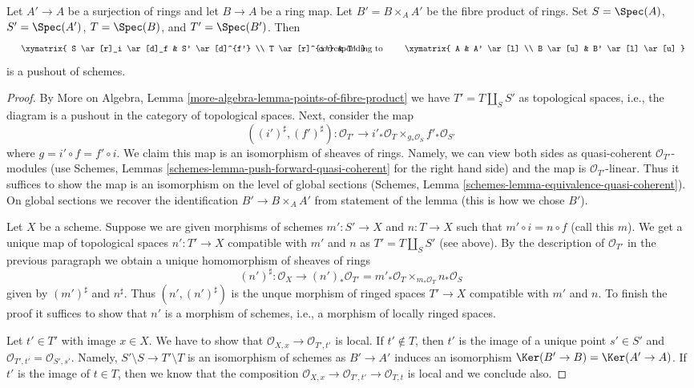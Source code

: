 \begin{lemma}
\label{lemma-basic-example-pushout}
Let $A' \to A$ be a surjection of rings and let $B \to A$ be a ring map.
Let $B' = B \times_A A'$ be the fibre product of rings. Set
$S = \Spec(A)$, $S' = \Spec(A')$, $T = \Spec(B)$, and $T' = \Spec(B')$.
Then
$$
\vcenter{
\xymatrix{
S \ar[r]_i \ar[d]_f & S' \ar[d]^{f'} \\
T \ar[r]^{i'} & T'
}
}
\quad\text{corresponding to}\quad
\vcenter{
\xymatrix{
A & A' \ar[l] \\
B \ar[u] & B' \ar[l] \ar[u]
}
}
$$
is a pushout of schemes.
\end{lemma}

\begin{proof}
By More on Algebra, Lemma \ref{more-algebra-lemma-points-of-fibre-product}
we have $T' = T \amalg_S S'$ as topological spaces, i.e., the diagram
is a pushout in the category of topological spaces. Next, consider
the map
$$
((i')^\sharp, (f')^\sharp) :
\mathcal{O}_{T'}
\longrightarrow
i'_*\mathcal{O}_T \times_{g_*\mathcal{O}_S} f'_*\mathcal{O}_{S'}
$$
where $g = i' \circ f = f' \circ i$. We claim this map is an isomorphism of
sheaves of rings. Namely, we can view both sides as quasi-coherent
$\mathcal{O}_{T'}$-modules (use
Schemes, Lemmas \ref{schemes-lemma-push-forward-quasi-coherent}
for the right hand side) and the map is $\mathcal{O}_{T'}$-linear.
Thus it suffices to show the map is an isomorphism on the level
of global sections
(Schemes, Lemma \ref{schemes-lemma-equivalence-quasi-coherent}).
On global sections we recover the identification
$B' \to B \times_A A'$ from statement of the lemma (this is
how we chose $B'$).

\medskip\noindent
Let $X$ be a scheme. Suppose we are given morphisms of schemes
$m' : S' \to X$ and $n : T \to X$ such that $m' \circ i = n \circ f$
(call this $m$). We get a unique map of topological spaces
$n' : T' \to X$ compatible with $m'$ and $n$ as
$T' = T \amalg_S S'$ (see above).
By the description of $\mathcal{O}_{T'}$ in the previous
paragraph we obtain a unique homomorphism of sheaves of rings
$$
(n')^\sharp :
\mathcal{O}_X
\longrightarrow
(n')_*\mathcal{O}_{T'} =
m'_*\mathcal{O}_T \times_{m_*\mathcal{O}_T} n_*\mathcal{O}_S
$$
given by $(m')^\sharp$ and $n^\sharp$.
Thus $(n', (n')^\sharp)$ is the unque morphism of
ringed spaces $T' \to X$ compatible with $m'$ and $n$.
To finish the proof it suffices to show that $n'$
is a morphism of schemes, i.e., a morphism of locally ringed spaces.

\medskip\noindent
Let $t' \in T'$ with image $x \in X$.
We have to show that $\mathcal{O}_{X, x} \to \mathcal{O}_{T', t'}$
is local. If $t' \not \in T$, then $t'$ is the image of a unique
point $s' \in S'$ and $\mathcal{O}_{T', t'} = \mathcal{O}_{S', s'}$.
Namely, $S' \setminus S \to T' \setminus T$ is an isomorphism of
schemes as $B' \to A'$ induces an isomorphism
$\Ker(B' \to B) = \Ker(A' \to A)$.
If $t'$ is the image of $t \in T$, then
we know that the composition
$\mathcal{O}_{X, x} \to \mathcal{O}_{T', t'} \to \mathcal{O}_{T, t}$
is local and we conclude also.
\end{proof}

